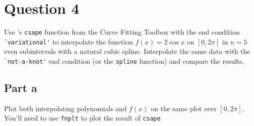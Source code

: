 \section{Question 4}

\begin{question}
    Use \MATLAB's \verb+csape+ function from the Curve Fitting Toolbox with the end condition \verb+`variational'+ to interpolate the function $f(x) = 2\cos x$ on $[0,2\pi]$ in $n=5$ even subintervals with a natural cubic spline. Interpolate the same data with the \verb+`not-a-knot'+ end condition (or the \verb+spline+ function) and compare the results.
\end{question}

\subsection{Part a}

\begin{question}
    Plot both interpolating polynomials and $f(x)$ on the same plot over $[0,2\pi]$. You'll need to use \verb+fnplt+ to plot the result of \verb+csape+
\end{question}

